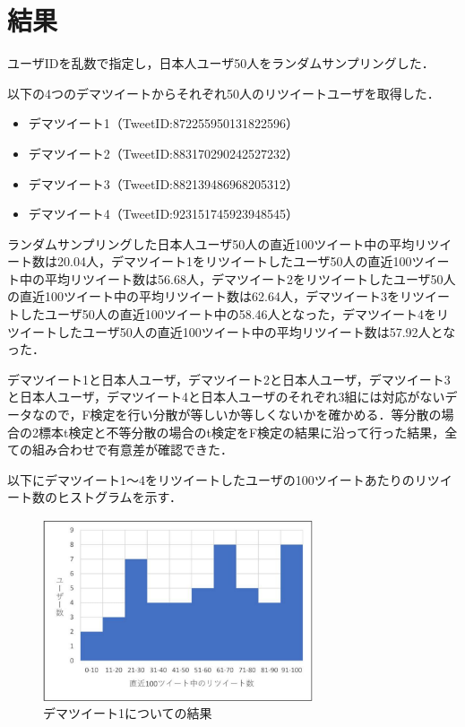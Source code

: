 \documentclass[uplatex,twocolumn]{jsarticle}
\begin{document}
\section{結果}
ユーザIDを乱数で指定し，日本人ユーザ50人をランダムサンプリングした．

以下の4つのデマツイートからそれぞれ50人のリツイートユーザを取得した．
\begin{itemize}
 \item デマツイート1（TweetID:872255950131822596）
 \item デマツイート2（TweetID:883170290242527232）
 \item デマツイート3（TweetID:882139486968205312）
 \item デマツイート4（TweetID:923151745923948545）
\end{itemize}

ランダムサンプリングした日本人ユーザ50人の直近100ツイート中の平均リツイート数は20.04人，デマツイート1をリツイートしたユーザ50人の直近100ツイート中の平均リツイート数は56.68人，デマツイート2をリツイートしたユーザ50人の直近100ツイート中の平均リツイート数は62.64人，デマツイート3をリツイートしたユーザ50人の直近100ツイート中の58.46人となった，デマツイート4をリツイートしたユーザ50人の直近100ツイート中の平均リツイート数は57.92人となった．

デマツイート1と日本人ユーザ，デマツイート2と日本人ユーザ，デマツイート3と日本人ユーザ，デマツイート4と日本人ユーザのそれぞれ3組には対応がないデータなので，F検定を行い分散が等しいか等しくないかを確かめる．等分散の場合の2標本t検定と不等分散の場合のt検定をF検定の結果に沿って行った結果，全ての組み合わせで有意差が確認できた．

以下にデマツイート1～4をリツイートしたユーザの100ツイートあたりのリツイート数のヒストグラムを示す．

\begin{figure}[htbp]
\centering
\includegraphics[clip,width=8.0cm]{d1.pdf}
\caption{デマツイート1についての結果}
\label{ヒストグラム1}
\end{figure}
\end{document}
